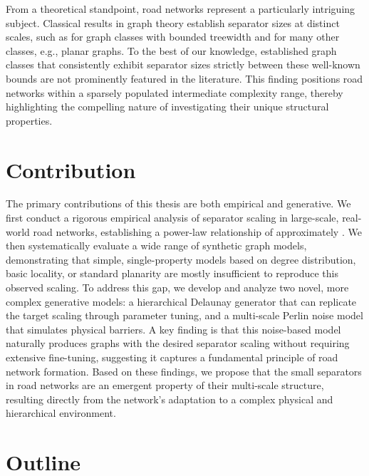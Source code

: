 From a theoretical standpoint, road networks represent a particularly intriguing subject.
Classical results in graph theory establish separator sizes at distinct scales, such as  for graph classes with bounded treewidth and  for many other classes, e.g., planar graphs.
To the best of our knowledge, established graph classes that consistently exhibit separator sizes strictly between these well-known bounds are not prominently featured in the literature.
This finding positions road networks within a sparsely populated intermediate complexity range, thereby highlighting the compelling nature of investigating their unique structural properties.

\section{Contribution}
\label{sec:contribution}

The primary contributions of this thesis are both empirical and generative.
We first conduct a rigorous empirical analysis of separator scaling in large-scale, real-world road networks, establishing a power-law relationship of approximately .
We then systematically evaluate a wide range of synthetic graph models, demonstrating that simple, single-property models based on degree distribution, basic locality, or standard planarity are mostly insufficient to reproduce this observed scaling.
To address this gap, we develop and analyze two novel, more complex generative models: a hierarchical Delaunay generator that can replicate the target scaling through parameter tuning, and a multi-scale Perlin noise model that simulates physical barriers.
A key finding is that this noise-based model naturally produces graphs with the desired  separator scaling without requiring extensive fine-tuning, suggesting it captures a fundamental principle of road network formation.
Based on these findings, we propose that the small separators in road networks are an emergent property of their multi-scale structure, resulting directly from the network's adaptation to a complex physical and hierarchical environment.

\section{Outline}
\label{sec:outline}


